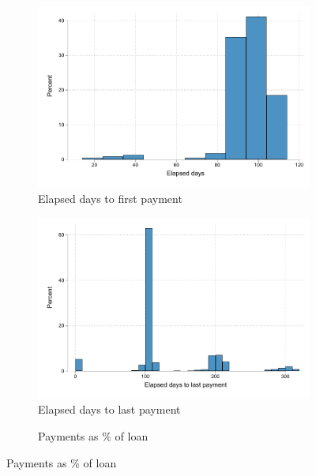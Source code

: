 \documentclass[11pt]{article}
\begin{document}
\begin{figure}[H]
    \caption{Behavior of those who lost pawn}
    \label{proxy_naive}
    \begin{center}
    \begin{subfigure}{0.40\textwidth}
        \caption{Elapsed days to first payment}
        \centering
        \includegraphics[width=\textwidth]{Figuras/hist_firstdays_default.pdf}
    \end{subfigure}
    \begin{subfigure}{0.40\textwidth}
        \caption{Elapsed days to last payment}
        \centering
        \includegraphics[width=\textwidth]{Figuras/hist_days_default.pdf}
    \end{subfigure}
        \begin{subfigure}{0.40\textwidth}
        \caption{Payments as \% of loan}
        \centering

\end{subfigure}
\end{center}
\end{figure}
\end{document}
